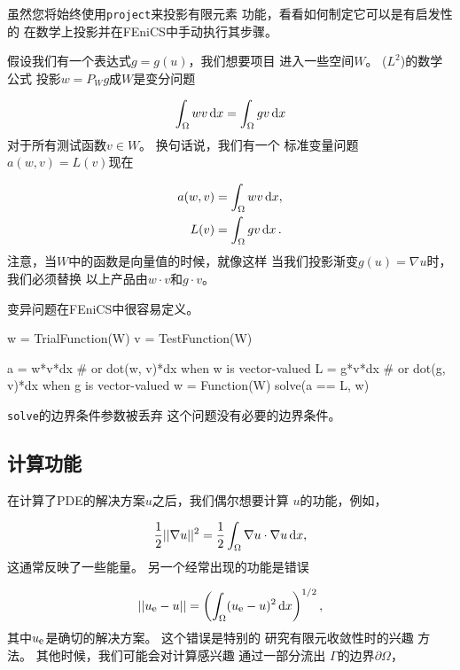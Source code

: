 \begin{notice}[手动投影。]
虽然您将始终使用\texttt{project}来投影有限元素
功能，看看如何制定它可以是有启发性的
在数学上投影并在FEniCS中手动执行其步骤。

假设我们有一个表达式$g = g(u)$，我们想要项目
进入一些空间$W$。 ($L^2$)的数学公式
投影$w = P_W g$成$W$是变分问题

\begin{equation}
  \int_{\Omega} w v \, \mathrm{d}x = \int_{\Omega} g v \, \mathrm{d}x
\end{equation}
对于所有测试函数$v\in W$。 换句话说，我们有一个
标准变量问题$a(w, v) = L(v)$现在

\begin{align}
a(w, v) &= \int_\Omega w v \, \mathrm{d}x,\\
L(v) &= \int_\Omega g v \, \mathrm{d}x\thinspace .
\end{align}
注意，当$W$中的函数是向量值的时候，就像这样
当我们投影渐变$g(u) = \nabla u$时，我们必须替换
以上产品由$w\cdot v$和$g\cdot v$。

变异问题在FEniCS中很容易定义。
\begin{python}
w = TrialFunction(W)
v = TestFunction(W)

a = w*v*dx  # or dot(w, v)*dx when w is vector-valued
L = g*v*dx  # or dot(g, v)*dx when g is vector-valued
w = Function(W)
solve(a == L, w)
\end{python}
\texttt{solve}的边界条件参数被丢弃
这个问题没有必要的边界条件。
\end{notice}

\subsection{计算功能}
\label{ch:poisson0:functionals}

在计算了PDE的解决方案$u$之后，我们偶尔想要计算
$u$的功能，例如，

\begin{equation}
{1\over2}||\nabla u||^2 = {1\over2}\int_\Omega \nabla u\cdot \nabla u \, \mathrm{d}x,
\label{ch:poisson0:functionals:energy}
\end{equation}
这通常反映了一些能量。
另一个经常出现的功能是错误

\begin{equation}
||u_{\mbox{\footnotesize e}}-u|| = \left(\int_\Omega (u_{\mbox{\footnotesize e}}-u)^2 \, \mathrm{d}x\right)^{1/2},
\label{ch:poisson0:functionals:error}
\end{equation}
其中$u_{\mbox{\footnotesize e}}$是确切的解决方案。 这个错误是特别的
研究有限元收敛性时的兴趣
方法。 其他时候，我们可能会对计算感兴趣
通过一部分流出
$\Gamma$的边界$\partial\Omega$，

